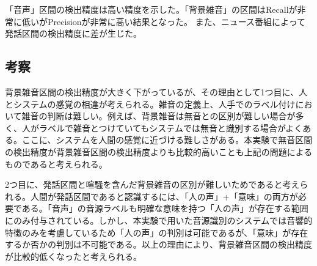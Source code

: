 「音声」区間の検出精度は高い精度を示した。「背景雑音」の区間はRecallが非常に低いがPrecisionが非常に高い結果となった。
また、ニュース番組によって発話区間の検出精度に差が生じた。

\subsection{考察}
背景雑音区間の検出精度が大きく下がっているが、その理由として1つ目に、人とシステムの感覚の相違が考えられる。雑音の定義上、人手でのラベル付けにおいて雑音の判断は難しい。例えば、背景雑音は無音との区別が難しい場合が多く、人がラベルで雑音とつけていてもシステムでは無音と識別する場合がよくある。ここに、システムを人間の感覚に近づける難しさがある。本実験で無音区間の検出精度が背景雑音区間の検出精度よりも比較的高いことも上記の問題によるものであると考えられる。\par
2つ目に、発話区間と喧騒を含んだ背景雑音の区別が難しいためであると考えられる。人間が発話区間であると認識するには、「人の声」+「意味」の両方が必要である。「音声」の音源ラベルも明確な意味を持つ「人の声」が存在する範囲にのみ付与されている。しかし、本実験で用いた音源識別のシステムでは音響的特徴のみを考慮しているため「人の声」の判別は可能であるが、「意味」が存在するか否かの判別は不可能である。以上の理由により、背景雑音区間の検出精度が比較的低くなったと考えられる。

